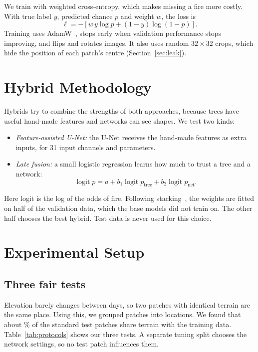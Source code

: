 \documentclass[conference]{IEEEtran}
\begin{document}
We train with weighted cross-entropy, which makes missing a fire more costly. With true label $y$, predicted chance $p$ and weight $w$, the loss is
\begin{equation}
\ell = -\left[w\,y\log p + (1-y)\log(1-p)\right].
\end{equation}
Training uses AdamW~\cite{loshchilov2019adamw}, stops early when validation performance stops improving, and flips and rotates images. It also uses random $32\times32$ crops, which hide the position of each patch's centre (Section~\ref{sec:leak}).

\section{Hybrid Methodology}
Hybrids try to combine the strengths of both approaches, because trees have useful hand-made features and networks can see shapes. We test two kinds:
\begin{itemize}
\item \emph{Feature-assisted U-Net:} the U-Net receives the hand-made features as extra inputs, for 31 input channels and \rUnetFeaturesParameters{} parameters.
\item \emph{Late fusion:} a small logistic regression learns how much to trust a tree and a network:
\begin{equation}
\operatorname{logit} p = a + b_1 \operatorname{logit} p_{\text{tree}} + b_2 \operatorname{logit} p_{\text{net}}.
\end{equation}
\end{itemize}
Here logit is the log of the odds of fire. Following stacking~\cite{wolpert1992stacking}, the weights are fitted on half of the validation data, which the base models did not train on. The other half chooses the best hybrid. Test data is never used for this choice.

\section{Experimental Setup}
\subsection{Three fair tests}
Elevation barely changes between days, so two patches with identical terrain are the same place. Using this, we grouped patches into \rLocationGroups{} locations. We found that about \rOfficialOverlap\% of the standard test patches share terrain with the training data. Table~\ref{tab:protocols} shows our three tests. A separate tuning split chooses the network settings, so no test patch influences them.
\end{document}
